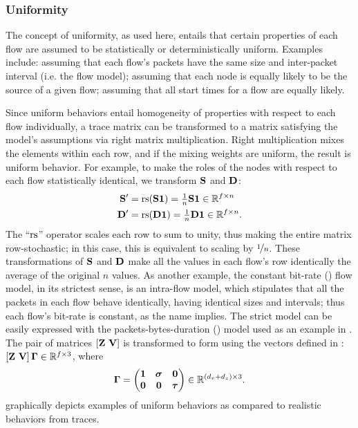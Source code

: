\documentclass[twocolumn,final]{svjour3}
\begin{document}
\subsubsection{Uniformity}

The concept of uniformity, as used here, entails that certain properties of each flow are assumed to be statistically or deterministically uniform.
Examples include:
assuming that each flow's packets have the same size and inter-packet interval (i.e. the  flow model);
assuming that each node is equally likely to be the source of a given flow; assuming that all start times for a flow are equally likely.

Since uniform behaviors entail homogeneity of properties with respect to each flow individually, a trace matrix can be transformed to a matrix satisfying the model's assumptions via right matrix multiplication.
Right multiplication mixes the elements within each row, and if the mixing weights are uniform, the result is uniform behavior.
For example, to make the roles of the nodes with respect to each flow statistically identical, we transform $\mathbf{S}$ and $\mathbf{D}$:
\begin{align}
\mathbf{S}' &= \text{rs}(\mathbf{S}\mathbf{1}) = {\textstyle{\frac{1}{n}}} \mathbf{S}\mathbf{1} \in \mathbb{R}^{f \times n} \\
\mathbf{D}' &= \text{rs}(\mathbf{D}\mathbf{1}) = {\textstyle{\frac{1}{n}}} \mathbf{D}\mathbf{1}\in \mathbb{R}^{f \times n}.
\end{align}
The ``$\text{rs}$'' operator scales each row to sum to unity, thus making the entire matrix row-stochastic;
in this case, this is equivalent to scaling by $\nicefrac{1}{n}$.
These transformations of $\mathbf{S}$ and $\mathbf{D}$ make all the values in each flow's row identically the average of the original $n$ values.
As another example, the constant bit-rate () flow model, in its strictest sense, is an intra-flow model, which stipulates that all the packets in each flow behave identically, having identical sizes and intervals;
thus each flow's bit-rate is constant, as the name implies.
The strict  model can be easily expressed with the packets-bytes-duration () model used as an example in .
The pair of matrices $[\mathbf{Z}~\mathbf{V}]$ is transformed to  form using the vectors defined in :
$[\mathbf{Z}~\mathbf{V}]\,\mathbf{\Gamma}\in\mathbb{R}^{f \times 3}$, where
\begin{align}
\mat{\Gamma}=\begin{pmatrix}
\ones & \vec{\sigma} & \zeros \\
\zeros & \zeros & \vec{\tau}
\end{pmatrix} \in \R^{(d_v+d_z)\times{3}}.
\end{align}
 graphically depicts examples of uniform behaviors as compared to realistic behaviors from traces.
\end{document}
